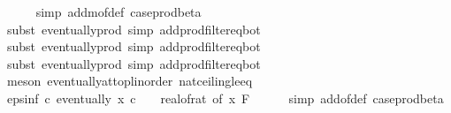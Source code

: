 \begin{isabellebody}
\ \ \ \ \isamarkupfalse%
\ {\isacharparenleft}{\kern0pt}simp\ add{\isacharcolon}{\kern0pt}m{\isacharunderscore}{\kern0pt}of{\isacharunderscore}{\kern0pt}def\ case{\isacharunderscore}{\kern0pt}prod{\isacharunderscore}{\kern0pt}beta{\isacharprime}{\kern0pt}{\isacharparenright}{\kern0pt}\isanewline
\ \ \ \ \isamarkupfalse%
\ {\isacharparenleft}{\kern0pt}subst\ eventually{\isacharunderscore}{\kern0pt}prod{}{\isacharprime}{\kern0pt}{\isacharcomma}{\kern0pt}\ simp\ add{\isacharcolon}{\kern0pt}prod{\isacharunderscore}{\kern0pt}filter{\isacharunderscore}{\kern0pt}eq{\isacharunderscore}{\kern0pt}bot{\isacharparenright}{\kern0pt}\isanewline
\ \ \ \ \isamarkupfalse%
\ {\isacharparenleft}{\kern0pt}subst\ eventually{\isacharunderscore}{\kern0pt}prod{}{\isacharprime}{\kern0pt}{\isacharcomma}{\kern0pt}\ simp\ add{\isacharcolon}{\kern0pt}prod{\isacharunderscore}{\kern0pt}filter{\isacharunderscore}{\kern0pt}eq{\isacharunderscore}{\kern0pt}bot{\isacharparenright}{\kern0pt}\isanewline
\ \ \ \ \isamarkupfalse%
\ {\isacharparenleft}{\kern0pt}subst\ eventually{\isacharunderscore}{\kern0pt}prod{}{\isacharprime}{\kern0pt}{\isacharcomma}{\kern0pt}\ simp\ add{\isacharcolon}{\kern0pt}prod{\isacharunderscore}{\kern0pt}filter{\isacharunderscore}{\kern0pt}eq{\isacharunderscore}{\kern0pt}bot{\isacharparenright}{\kern0pt}\isanewline
\ \ \ \ \isamarkupfalse%
\ {\isacharparenleft}{\kern0pt}meson\ eventually{\isacharunderscore}{\kern0pt}at{\isacharunderscore}{\kern0pt}top{\isacharunderscore}{\kern0pt}linorder\ nat{\isacharunderscore}{\kern0pt}ceiling{\isacharunderscore}{\kern0pt}le{\isacharunderscore}{\kern0pt}eq{\isacharparenright}{\kern0pt}\isanewline
\isanewline
\ \ \isamarkupfalse%
\ eps{\isacharunderscore}{\kern0pt}inf{\isacharcolon}{\kern0pt}\ {\isachardoublequoteopen}{\isasymAnd}c{\isachardot}{\kern0pt}\ eventually\ {\isacharparenleft}{\kern0pt}{\isasymlambda}x{\isachardot}{\kern0pt}\ c\ {\isasymle}\ {}\ {\isacharslash}{\kern0pt}\ {\isacharparenleft}{\kern0pt}real{\isacharunderscore}{\kern0pt}of{\isacharunderscore}{\kern0pt}rat\ {\isacharparenleft}{\kern0pt}{\isasymepsilon}{\isacharunderscore}{\kern0pt}of\ x{\isacharparenright}{\kern0pt}{\isacharparenright}{\kern0pt}{\isacharparenright}{\kern0pt}\ {\isacharquery}{\kern0pt}F{\isachardoublequoteclose}\isanewline
\ \ \ \ \isamarkupfalse%
\ {\isacharparenleft}{\kern0pt}simp\ add{\isacharcolon}{\kern0pt}{\isasymepsilon}{\isacharunderscore}{\kern0pt}of{\isacharunderscore}{\kern0pt}def\ case{\isacharunderscore}{\kern0pt}prod{\isacharunderscore}{\kern0pt}beta{\isacharprime}{\kern0pt}{\isacharparenright}{\kern0pt}\isanewline

\end{isabellebody}

